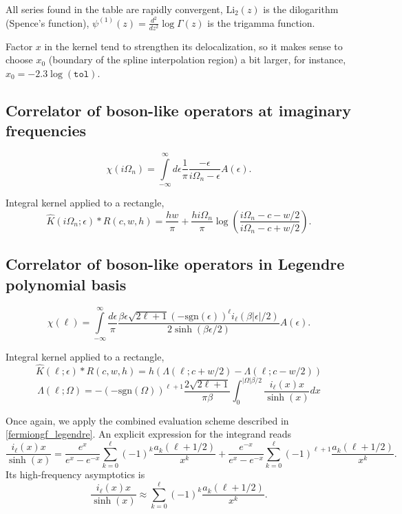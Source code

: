 \documentclass[]{article}
\newcommand{\dilog}{\ensuremath{\mathrm{Li}_2}}
\begin{document}
All series found in the table are rapidly convergent, $\dilog(z)$ is the dilogarithm (Spence's function),
$\psi^{(1)}(z) = \frac{d^2}{dz^2}\log\Gamma(z)$ is the trigamma function.

Factor $x$ in the kernel tend to strengthen its delocalization, so
it makes sense to choose $x_0$ (boundary of the spline interpolation region)
a bit larger, for instance, $x_0=-2.3\log(\mathtt{tol})$.

\subsection{Correlator of boson-like operators at imaginary frequencies}
\label{bosoncorr_imfreq}
\begin{equation}
\chi(i\Omega_n) = \int\limits_{-\infty}^\infty
d\epsilon \frac{1}{\pi}\frac{-\epsilon}{i\Omega_n-\epsilon} A(\epsilon).
\end{equation}

Integral kernel applied to a rectangle,
\begin{equation}
\hat K(i\Omega_n;\epsilon)*R(c,w,h) =
\frac{hw}{\pi} + \frac{hi\Omega_n}{\pi}\log\left(\frac{i\Omega_n - c - w/2}{i\Omega_n - c + w/2}\right).
\end{equation}

\subsection{Correlator of boson-like operators in Legendre polynomial basis}
\label{bosoncorr_legendre}
\begin{equation}
	\chi(\ell) = \int\limits_{-\infty}^\infty
	\frac{d\epsilon}{\pi}
	\frac{\beta\epsilon\sqrt{2\ell+1}(-\mathrm{sgn}(\epsilon))^\ell i_{\ell}(\beta|\epsilon|/2)}
	{2\sinh(\beta\epsilon/2)} A(\epsilon).
\end{equation}

Integral kernel applied to a rectangle,
\begin{equation}
	\hat K(\ell;\epsilon)*R(c,w,h) = h (\Lambda(\ell;c+w/2) - \Lambda(\ell;c-w/2))
\end{equation}
\begin{equation}
	\Lambda(\ell;\Omega) = -(-\mathrm{sgn}(\Omega))^{\ell+1}
	\frac{2\sqrt{2\ell+1}}{\pi\beta}
	\int_0^{|\Omega|\beta/2} \frac{i_\ell(x) x}{\sinh(x)} dx
\end{equation}

Once again, we apply the combined evaluation scheme described in
\ref{fermiongf_legendre}. An explicit expression for the integrand reads
\begin{equation}\label{il_x_sinh_series}
	\frac{i_\ell(x) x}{\sinh(x)} =
	\frac{e^x}{e^x-e^{-x}}\sum_{k=0}^\ell(-1)^k
	\frac{a_k(\ell+1/2)}{x^k} +
	\frac{e^{-x}}{e^x-e^{-x}}\sum_{k=0}^\ell(-1)^{\ell+1}
	\frac{a_k(\ell+1/2)}{x^k}.
\end{equation}
Its high-frequency asymptotics is
\begin{equation}
	\frac{i_\ell(x) x}{\sinh(x)} \approx
		\sum_{k=0}^\ell(-1)^k \frac{a_k(\ell+1/2)}{x^k}.
\end{equation}
\end{document}
